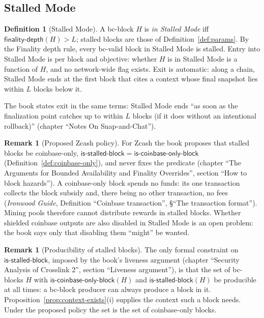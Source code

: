 \documentclass[11pt,a4paper]{article}
\theoremstyle{definition}
\newtheorem{definition}[theorem]{Definition}
\newtheorem{remark}[theorem]{Remark}
\newcommand{\isstalledblock}{\mathsf{is\text{-}stalled\text{-}block}}
\newcommand{\iscoinbaseonlyblock}{\mathsf{is\text{-}coinbase\text{-}only\text{-}block}}
\newcommand{\finalitydepth}{\mathsf{finality\text{-}depth}}
\begin{document}
\subsection{Stalled Mode}\label{sec:cons-stalled}

\begin{definition}[Stalled Mode]\label{def:stalled}
A bc-block $H$ is \emph{in Stalled Mode} iff $\finalitydepth(H) > L$;
stalled blocks are those of Definition~\ref{def:params}. By the Finality
depth rule, every bc-valid block in Stalled Mode is stalled. Entry into
Stalled Mode is per block and objective: whether $H$ is in Stalled Mode is a
function of $H$, and no network-wide flag exists. Exit is automatic: along a
chain, Stalled Mode ends at the first block that cites a context whose final
snapshot lies within $L$ blocks below it.
\end{definition}

The book states exit in the same terms: Stalled Mode ends ``as soon as the
finalization point catches up to within $L$ blocks (if it does without an
intentional rollback)'' (chapter ``Notes On Snap-and-Chat'').

\begin{remark}[Proposed Zcash policy]\label{rem:stalled-policy}
For Zcash the book proposes that stalled blocks be coinbase-only,
$\isstalledblock = \iscoinbaseonlyblock$ (Definition~\ref{def:coinbase-only}),
and never fixes the predicate (chapter ``The Arguments for Bounded
Availability and Finality Overrides'', section ``How to block hazards''). A
coinbase-only block spends no funds: its one transaction collects the block
subsidy and, there being no other transaction, no fees (\emph{Ironwood
Guide}, Definition ``Coinbase transaction'', \S``The transaction format'').
Mining pools therefore cannot distribute rewards in stalled blocks. Whether
shielded coinbase outputs are also disabled in Stalled Mode is an open
problem: the book says only that disabling them ``might'' be wanted.
\end{remark}

\begin{remark}[Producibility of stalled blocks]\label{rem:producible}
The only formal constraint on $\isstalledblock$, imposed by the book's
liveness argument (chapter ``Security Analysis of Crosslink 2'', section
``Liveness argument''), is that the set of bc-blocks $H$ with
$\iscoinbaseonlyblock(H)$ and $\isstalledblock(H)$ be producible at all
times: a bc-block producer can always produce a block in it.
Proposition~\ref{prop:context-exists}(i) supplies the context such a block
needs. Under the proposed policy the set is the set of coinbase-only blocks.
\end{remark}
\end{document}
